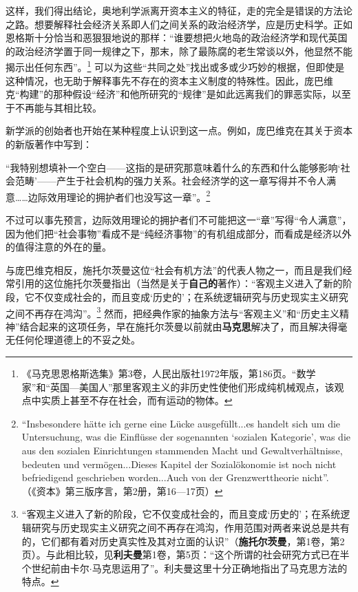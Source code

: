 \documentclass[fontset=fandol, a4paper, 12pt, openright]{ctexbook}
\begin{document}
这样，我们得出结论，奥地利学派离开资本主义的特征，走的完全是错误的方法论之路。想要解释社会经济关系即人们之间关系的政治经济学，应是历史科学。正如恩格斯十分恰当和恶狠狠地说的那样：“谁要想把火地岛的政治经济学和现代英国的政治经济学置于同一规律之下，那末，除了最陈腐的老生常谈以外，他显然不能揭示出任何东西”。\footnote{《马克思恩格斯选集》第3卷，人民出版社1972年版，第186页。“数学家”和“英国—美国人”那里客观主义的非历史性使他们形成纯机械观点，该观点中实质上甚至不存在社会，而有运动的物体。} 可以为这些“共同之处”找出或多或少巧妙的根据，但即使是这种情况，也无助于解释事先不存在的资本主义制度的特殊性。因此，庞巴维克“构建”的那种假设“经济”和他所研究的“规律”是如此远离我们的罪恶实际，以至于不再能与其相比较。

新学派的创始者也开始在某种程度上认识到这一点。例如，庞巴维克在其关于资本的新版著作中写到：

“我特别想填补一个空白——这指的是研究那意味着什么的东西和什么能够影响‘社会范畴’——产生于社会机构的强力关系。社会经济学的这一章写得并不令人满意……边际效用理论的拥护者们也没写这一章”。\footnote{``Insbesondere h\"{a}tte ich gerne eine L\"{u}cke ausgef\"{u}llt...es handelt sich um die Untersuchung, was die Einfl\"{u}sse der sogenannten `sozialen Kategorie', was die aus den sozialen Einrichtungen stammenden Macht und Gewaltverh\"{a}ltnisse, bedeuten und verm\"{o}gen...Dieses Kapitel der Sozial\"{o}konomie ist noch nicht befriedigend geschrieben worden...Auch von der Grenzwerttheorie nicht''.（《资本》第三版序言，第2册，第16—17页）}

不过可以事先预言，边际效用理论的拥护者们不可能把这一“章”写得“令人满意”，因为他们把“社会事物”看成不是“纯经济事物”的有机组成部分，而看成是经济以外的值得注意的外在的量。

与庞巴维克相反，施托尔茨曼这位“社会有机方法”的代表人物之一，而且是我们经常引用的这位施托尔茨曼指出（当然是关于\textbf{自己的}著作）：“客观主义进入了新的阶段，它不仅变成社会的，而且变成‘历史的’；在系统逻辑研究与历史现实主义研究之间不再存在鸿沟”。\footnote{“客观主义进入了新的阶段，它不仅变成社会的，而且变成‘历史的’；在系统逻辑研究与历史现实主义研究之间不再存在鸿沟，作用范围对两者来说总是共有的，它们都有着对历史真实性及其对立面的认识”（\textbf{施托尔茨曼}，第1卷，第2页）。与此相比较，见\textbf{利夫曼}第1卷，第5页：“这个所谓的社会研究方式已在半个世纪前由卡尔$\cdot$马克思运用了”。利夫曼这里十分正确地指出了马克思方法的特点。} 然而，把经典作家的抽象方法与“客观主义”和“历史主义精神”结合起来的这项任务，早在施托尔茨曼以前就由\textbf{马克思}解决了，而且解决得毫无任何伦理道德上的不妥之处。
\end{document}
